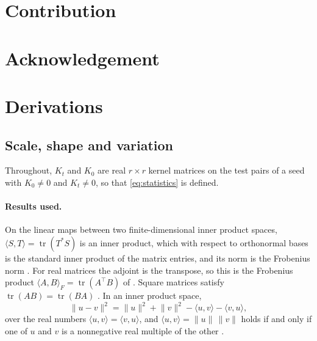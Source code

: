 \documentclass[a4paper,11pt]{article} %
\begin{document}

\section*{Contribution}


\section*{Acknowledgement}


\appendix
\section{Derivations}

\subsection{Scale, shape and variation}
\label{sec:identity}

Throughout, $K_t$ and $K_0$ are real $r\times r$ kernel matrices on the test
pairs of a seed with $K_0\neq0$ and $K_t\neq0$, so that \eqref{eq:statistics}
is defined.

\paragraph{Results used.} On the linear maps between two finite-dimensional
inner product spaces, $\langle S,T\rangle=\operatorname{tr}(T^*S)$ is an inner
product, which with respect to orthonormal bases is the standard inner product
of the matrix entries, and its norm is the Frobenius norm
\citep{axlerLinearAlgebraDone2024}. For real matrices the adjoint is the
transpose, so this is the Frobenius product
$\langle A,B\rangle_F=\operatorname{tr}(A^\top B)$ of
\citet{cortesAlgorithmsLearningKernels2024}. Square matrices satisfy
$\operatorname{tr}(AB)=\operatorname{tr}(BA)$
\citep{axlerLinearAlgebraDone2024}. In an inner product space,
\begin{equation*}
  \lVert u-v\rVert^2 = \lVert u\rVert^2 + \lVert v\rVert^2
  - \langle u,v\rangle - \langle v,u\rangle ,
\end{equation*}
over the real numbers $\langle u,v\rangle=\langle v,u\rangle$, and
$\langle u,v\rangle=\lVert u\rVert\,\lVert v\rVert$ holds if and only if one of
$u$ and $v$ is a nonnegative real multiple of the other
\citep{axlerLinearAlgebraDone2024}.
\end{document}
